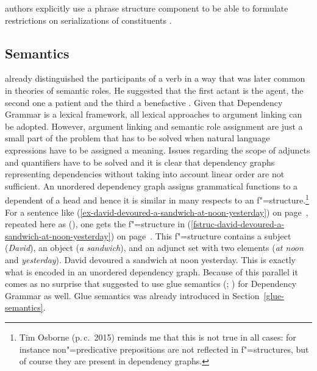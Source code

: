 authors explicitly use a phrase structure component to be able to formulate restrictions on
serializations of constituents \citep{GK2001a,Hellwig2003a}. 



\subsection{Semantics}

\tes already distinguished the participants of a verb in a way that was later common in theories of
semantic roles. He suggested that the first actant is the agent, the second one a patient and the
third a benefactive \citep[Chapter~106]{Tesniere2015a-not-crossreferenced}.
Given that Dependency Grammar is a lexical framework, all
lexical approaches to argument linking can be adopted. However, argument linking and semantic
role assignment are just a small part of the problem that has to be solved when natural language
expressions have to be assigned a meaning. 
Issues regarding the scope of adjuncts and quantifiers
have to be solved and it is clear that dependency graphs representing dependencies without taking
into account linear order are not sufficient. An unordered dependency graph assigns grammatical
functions to a dependent of a head and hence it is similar in many respects to an \lfg
f"=structure.\footnote{
Tim Osborne (p.\,c.\ 2015) reminds me that this is not true in all cases: for instance non"=predicative prepositions are not reflected in f"=structures, but of course they are present in
dependency graphs.
} For a sentence
like (\ref{ex-david-devoured-a-sandwich-at-noon-yesterday}) on page~\pageref{ex-david-devoured-a-sandwich-at-noon-yesterday}, repeated here as (), one gets
the f"=structure in (\ref{fstruc-david-devoured-a-sandwich-at-noon-yesterday}) on
page~\pageref{fstruc-david-devoured-a-sandwich-at-noon-yesterday}. This f"=structure contains a
subject (\emph{David}), an object (\emph{a sandwich}), and an adjunct set with two elements
(\emph{at noon} and \emph{yesterday}).
\ea
\label{ex-david-devoured-a-sandwich-at-noon-yesterday-two}
David devoured a sandwich at noon yesterday.
\z
This is exactly what is encoded in an unordered dependency graph. Because of this parallel it comes
as no surprise that \citet[]{Broeker2003a-u} suggested to use glue semantics
(\citealp*{DLS93a-u}; \citealp[Chapter~8]{Dalrymple2001a-u}) for Dependency
Grammar as well. Glue semantics was already introduced in Section~\ref{glue-semantics}.

